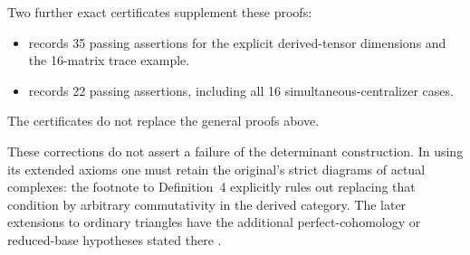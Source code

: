 Two further exact certificates supplement these proofs:
\begin{itemize}
\item {} records
35 passing assertions for the explicit derived-tensor dimensions and
the 16-matrix trace example.
\item {} records
22 passing assertions, including all 16 simultaneous-centralizer cases.
\end{itemize}
The certificates do not replace the general proofs above.

These corrections do not assert a failure of the determinant
construction.  In using its extended axioms one must retain the
original's strict diagrams of actual complexes: the footnote to
Definition~4 explicitly rules out replacing that condition by
arbitrary commutativity in the derived category.  The later extensions
to ordinary triangles have the additional perfect-cohomology or
reduced-base hypotheses stated there
\cite[pp.~37--46, especially p.~41 footnote and pp.~43--44]{ROOT_KnudsenMumford1976}.

